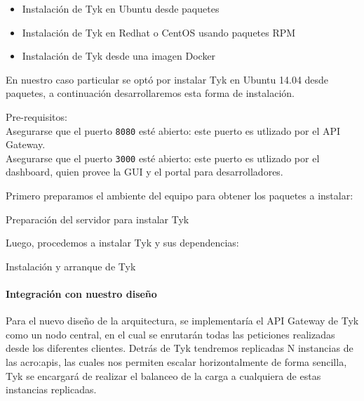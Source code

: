 \begin{itemize}
  \item Instalación de Tyk en Ubuntu desde paquetes
  \item Instalación de Tyk en Redhat o CentOS usando paquetes RPM
  \item Instalación de Tyk desde una imagen Docker
\end{itemize}

En nuestro caso particular se optó por instalar Tyk en Ubuntu 14.04 desde paquetes, a continuación desarrollaremos esta forma de instalación.

Pre-requisitos:\\
Asegurarse que el puerto \texttt{8080} esté abierto: este puerto es utlizado por el API Gateway.\\
Asegurarse que el puerto \texttt{3000} esté abierto: este puerto es utlizado por el dashboard, quien provee la GUI y el portal para desarrolladores.

Primero preparamos el ambiente del equipo para obtener los paquetes a instalar:

\begin{listing}[H]
  \caption{Preparación del servidor para instalar Tyk}
  \label{soa:tecnologias:tyk:bash-preparacion}
\end{listing}

Luego, procedemos a instalar Tyk y sus dependencias:

\begin{listing}[H]
  \caption{Instalación y arranque de Tyk}
  \label{soa:tecnologias:tyk:bash-instalacion}
\end{listing}


\paragraph{Integración con nuestro diseño}

Para el nuevo diseño de la arquitectura, se implementaría el API Gateway de Tyk como un nodo central, en el cual se enrutarán todas las peticiones realizadas desde los diferentes clientes.  Detrás de Tyk tendremos replicadas N instancias de las \glspl{acro:api}, las cuales nos permiten escalar horizontalmente de forma sencilla, Tyk se encargará de realizar el balanceo de la carga a cualquiera de estas instancias replicadas.


